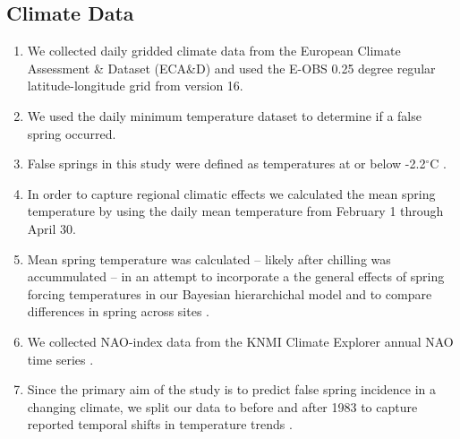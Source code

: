 \documentclass{article}\usepackage[]{graphicx}\usepackage[]{color}
\begin{document}
\subsection*{Climate Data}
\begin{enumerate}
\item We collected daily gridded climate data from the European Climate Assessment \& Dataset (ECA\&D) and used the E-OBS 0.25 degree regular latitude-longitude grid from version 16. 
\item We used the daily minimum temperature dataset to determine if a false spring occurred.
\item False springs in this study were defined as temperatures at or below -2.2$^{\circ}$C \citep{Schwartz1993}.
\item In order to capture regional climatic effects we calculated the mean spring temperature by using the daily mean temperature from February 1 through April 30.
\item Mean spring temperature was calculated -- likely after chilling was accummulated -- in an attempt to incorporate a the general effects of spring forcing temperatures in our Bayesian hierarchichal model and to compare differences in spring across sites \citep{Basler2012, Korner2016}.
\item We collected NAO-index data from the KNMI Climate Explorer annual NAO time series \citep{NAO}.
\item Since the primary aim of the study is to predict false spring incidence in a changing climate, we split our data to before and after 1983 to capture reported temporal shifts in temperature trends \citep{Stocker2013, Kharouba2018}.
\end{enumerate}
\end{document}
